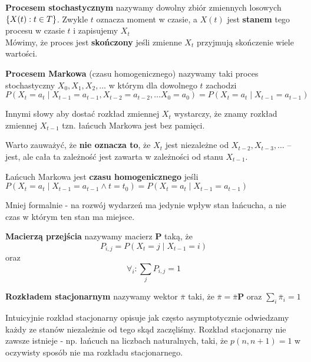 \begin{definition}
	\textbf{Procesem stochastycznym} nazywamy dowolny zbiór zmiennych losowych \(\set{X(t) : t \in T}\).
	Zwykle \(t\) oznacza moment w czasie, a \(X(t)\) jest \textbf{stanem} tego procesu w czasie \(t\) i zapisujemy \(X_t\) \\
	Mówimy, że proces jest \textbf{skończony} jeśli zmienne \(X_t\) przyjmują skończenie wiele wartości.
\end{definition}

\begin{definition}
	\textbf{Procesem Markowa} (czasu homogenicznego) nazywamy taki proces stochastyczny \(X_0, X_1, X_2, \dots\) w którym dla dowolnego \(t\) zachodzi
	\[
		P(X_t = a_t \mid X_{t-1} = a_{t-1}, X_{t-2} = a_{t-2}, \dots X_0 = a_0) =
		P(X_t = a_t \mid X_{t-1} = a_{t-1})
	\]
\end{definition}

Innymi słowy aby dostać rozkład zmiennej \(X_t\) wystarczy, że znamy rozkład zmiennej \(X_{t-1}\) tzn. łańcuch Markowa jest bez pamięci.

Warto zauważyć, że \textbf{nie oznacza to}, że \(X_t\) jest niezależne od \(X_{t-2}, X_{t-3}, \dots\) --
jest, ale cała ta zależność jest zawarta w zależności od stanu \(X_{t-1}\).

\begin{definition}
	Łańcuch Markowa jest \textbf{czasu homogenicznego} jeśli \(
	P(X_t = a_t \mid X_{t-1} = a_{t-1} \land t = t_0) = P(X_t = a_t \mid X_{t-1} = a_{t-1})
	\)
\end{definition}
Mniej formalnie - na rozwój wydarzeń ma jedynie wpływ stan łańcucha, a nie czas w którym ten stan ma miejsce.

\begin{definition}
	\textbf{Macierzą przejścia} nazywamy macierz \(\mathbf{P}\) taką, że
	\[
		P_{i, j} = P(X_t = j \mid X_{t-1} = i)
	\]
	oraz
	\[
		\forall_i : \sum_j P_{i, j} = 1
	\]
\end{definition}

\begin{definition}
	\textbf{Rozkładem stacjonarnym} nazywamy wektor \( \bar \pi \) taki, że \( \bar \pi = \bar \pi \mathbf{P} \) oraz \( \sum_i \bar \pi_i = 1 \)
\end{definition}
Intuicyjnie rozkład stacjonarny opisuje jak często asymptotycznie odwiedzamy każdy ze stanów niezależnie od tego skąd zaczęliśmy. Rozkład stacjonarny nie zawsze istnieje - np. łańcuch na liczbach naturalnych, taki, że \( p(n, n + 1) = 1\) w oczywisty sposób nie ma rozkładu stacjonarnego.


